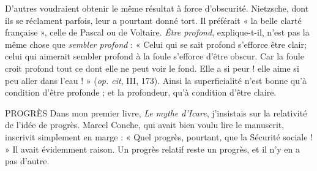D’autres voudraient obtenir le même résultat à force d’obscurité. Nietzsche,
dont ils se réclament parfois, leur a pourtant donné tort. Il préférait « la belle
clarté française », celle de Pascal ou de Voltaire. {\it Être profond}, explique-t-il, n’est
pas la même chose que {\it sembler profond} : « Celui qui se sait profond s’efforce
être clair; celui qui aimerait sembler profond à la foule s'efforce d’être
obscur. Car la foule croit profond tout ce dont elle ne peut voir le fond. Elle a
si peur ! elle aime si peu aller dans l’eau ! » ({\it op. cit}, III, 173). Ainsi la superficialité
n’est bonne qu’à condition d’être profonde ; et la profondeur, qu'à
condition d’être claire.

PROGRÈS Dans mon premier livre, {\it Le mythe d'Icare}, j'insistais sur la relativité
de l’idée de progrès. Marcel Conche, qui avait bien voulu
lire le manuscrit, inscrivit simplement en marge : « Quel progrès, pourtant, que
la Sécurité sociale ! » Il avait évidemment raison. Un progrès relatif reste un
progrès, et il n’y en a pas d’autre.

